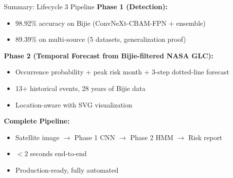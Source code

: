 \documentclass[aspectratio=169]{beamer}
\begin{document}
\begin{frame}{Summary: Lifecycle 3 Pipeline}
    \textbf{Phase 1 (Detection):}
    \begin{itemize}
        \item 98.92\% accuracy on Bijie (ConvNeXt-CBAM-FPN + ensemble)
        \item 89.39\% on multi-source (5 datasets, generalization proof)
    \end{itemize}

    \vspace{0.2cm}
    \textbf{Phase 2 (Temporal Forecast from Bijie-filtered NASA GLC):}
    \begin{itemize}
        \item Occurrence probability + peak risk month + 3-step dotted-line forecast
        \item 13+ historical events, 28 years of Bijie data
        \item Location-aware with SVG visualization
    \end{itemize}

    \vspace{0.2cm}
    \textbf{Complete Pipeline:}
    \begin{itemize}
        \item Satellite image $\to$ Phase 1 CNN $\to$ Phase 2 HMM $\to$ Risk report
        \item $<2$ seconds end-to-end
        \item Production-ready, fully automated
    \end{itemize}
\end{frame}
\end{document}
